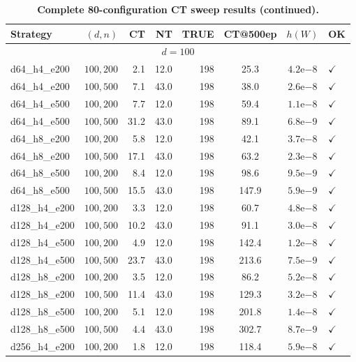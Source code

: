 \documentclass[12pt,a4paper]{article}
\begin{document}
\newpage
\begin{table}[H]
\centering
\small
\caption{\textbf{Complete 80-configuration CT sweep results (continued).}}
\begin{tabular}{lrrrrccl}
\toprule
\textbf{Strategy} & \textbf{$(d,n)$} & \textbf{CT} & \textbf{NT} & \textbf{TRUE} & \textbf{CT@500ep} & $h(W)$ & \textbf{OK} \\
\midrule
\multicolumn{8}{c}{\textbf{$d=100$}} \\
\midrule
d64\_h4\_e200 & $100,200$ & 2.1 & 12.0 & 198 & 25.3 & $4.2$e$-8$ & $\checkmark$ \\
d64\_h4\_e200 & $100,500$ & 7.1 & 43.0 & 198 & 38.0 & $2.6$e$-8$ & $\checkmark$ \\
d64\_h4\_e500 & $100,200$ & 7.7 & 12.0 & 198 & 59.4 & $1.1$e$-8$ & $\checkmark$ \\
d64\_h4\_e500 & $100,500$ & 31.2 & 43.0 & 198 & 89.1 & $6.8$e$-9$ & $\checkmark$ \\
d64\_h8\_e200 & $100,200$ & 5.8 & 12.0 & 198 & 42.1 & $3.7$e$-8$ & $\checkmark$ \\
d64\_h8\_e200 & $100,500$ & 17.1 & 43.0 & 198 & 63.2 & $2.3$e$-8$ & $\checkmark$ \\
d64\_h8\_e500 & $100,200$ & 8.4 & 12.0 & 198 & 98.6 & $9.5$e$-9$ & $\checkmark$ \\
d64\_h8\_e500 & $100,500$ & 15.5 & 43.0 & 198 & 147.9 & $5.9$e$-9$ & $\checkmark$ \\
d128\_h4\_e200 & $100,200$ & 3.3 & 12.0 & 198 & 60.7 & $4.8$e$-8$ & $\checkmark$ \\
d128\_h4\_e200 & $100,500$ & 10.2 & 43.0 & 198 & 91.1 & $3.0$e$-8$ & $\checkmark$ \\
d128\_h4\_e500 & $100,200$ & 4.9 & 12.0 & 198 & 142.4 & $1.2$e$-8$ & $\checkmark$ \\
d128\_h4\_e500 & $100,500$ & 23.7 & 43.0 & 198 & 213.6 & $7.5$e$-9$ & $\checkmark$ \\
d128\_h8\_e200 & $100,200$ & 3.5 & 12.0 & 198 & 86.2 & $5.2$e$-8$ & $\checkmark$ \\
d128\_h8\_e200 & $100,500$ & 11.4 & 43.0 & 198 & 129.3 & $3.2$e$-8$ & $\checkmark$ \\
d128\_h8\_e500 & $100,200$ & 5.1 & 12.0 & 198 & 201.8 & $1.4$e$-8$ & $\checkmark$ \\
d128\_h8\_e500 & $100,500$ & 4.4 & 43.0 & 198 & 302.7 & $8.7$e$-9$ & $\checkmark$ \\
d256\_h4\_e200 & $100,200$ & 1.8 & 12.0 & 198 & 118.4 & $5.9$e$-8$ & $\checkmark$ \\

\end{tabular}
\end{table}
\end{document}
